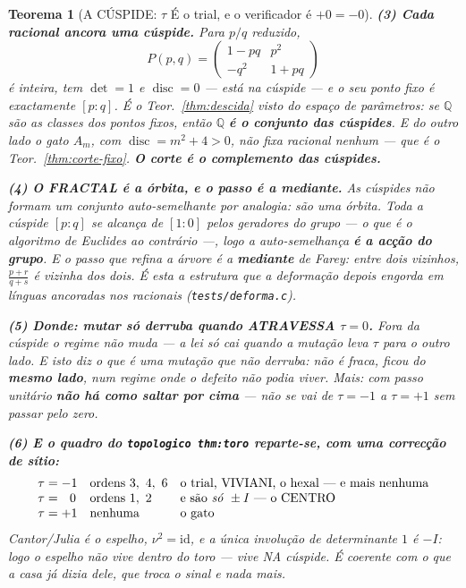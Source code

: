 \documentclass[11pt,a4paper]{article}
\newtheorem{teorema}{Teorema}
\newcommand{\code}[1]{\texttt{\small #1}}
\begin{document}
\begin{teorema}[A CÚSPIDE: $\tau$ É o trial, e o verificador é $+0=-0$]
\textbf{(3) Cada racional ancora uma cúspide.} Para $p/q$ reduzido,
\[
P(p,q)=\begin{pmatrix}1-pq & p^{2}\\ -q^{2} & 1+pq\end{pmatrix}
\]
é inteira, tem $\det=1$ e $\operatorname{disc}=0$ --- está na cúspide --- e o seu ponto fixo
é exactamente $[p:q]$. \emph{É o Teor.~\ref{thm:descida} visto do espaço de parâmetros}: se
$\mathbb{Q}$ são as classes dos pontos fixos, então $\mathbb{Q}$ \textbf{é o conjunto das
cúspides}. E do outro lado o gato $A_m$, com $\operatorname{disc}=m^{2}+4>0$, não fixa
racional nenhum --- que é o Teor.~\ref{thm:corte-fixo}. \textbf{O corte é o complemento das
cúspides.}

\textbf{(4) O FRACTAL é a órbita, e o passo é a mediante.} As cúspides não formam um
conjunto auto-semelhante por analogia: são \emph{uma} órbita. Toda a cúspide $[p:q]$ se
alcança de $[1:0]$ pelos geradores do grupo --- o que é o algoritmo de Euclides ao contrário
---, logo a auto-semelhança \textbf{é a acção do grupo}. E o passo que refina a árvore é a
\textbf{mediante} de Farey: entre dois vizinhos, $\frac{p+r}{q+s}$ é vizinha dos dois. É
esta a estrutura que a deformação depois engorda em línguas ancoradas nos racionais
(\code{tests/deforma.c}).

\textbf{(5) Donde: mutar só derruba quando ATRAVESSA $\tau=0$.} Fora da cúspide o regime
não muda --- a lei só cai quando a mutação leva $\tau$ para o outro lado. \emph{E isto diz o
que é uma mutação que não derruba}: não é fraca, ficou do \textbf{mesmo lado}, num regime
onde o defeito não podia viver. Mais: com passo unitário \textbf{não há como saltar por
cima} --- não se vai de $\tau=-1$ a $\tau=+1$ sem passar pelo zero.

\textbf{(6) E o quadro do \code{topologico thm:toro} reparte-se, com uma correcção de sítio:}
\[
\begin{array}{lll}
\tau=-1 & \text{ordens }3,\ 4,\ 6 & \text{o trial, VIVIANI, o hexal --- e mais nenhuma}\\
\tau=\ \ 0 & \text{ordens }1,\ 2 & \text{e são \emph{só} }\pm I\text{ --- o CENTRO}\\
\tau=+1 & \text{nenhuma} & \text{o gato}
\end{array}
\]
Cantor/Julia é o espelho, $\nu^{2}=\mathrm{id}$, e a única involução de determinante $1$ é
$-I$: \emph{logo o espelho não vive dentro do toro --- vive NA cúspide}. É coerente com o
que a casa já dizia dele, que troca o sinal e nada mais.


\end{teorema}
\end{document}
